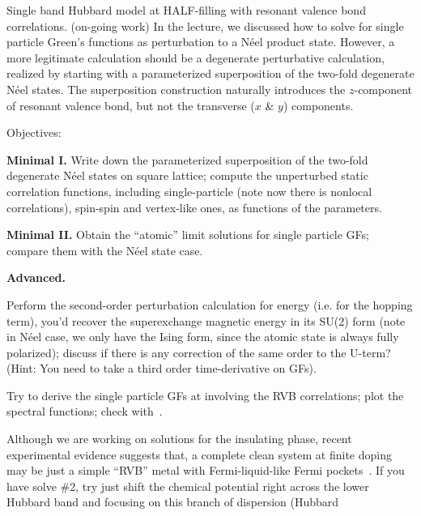 \begin{problem}
  Single band Hubbard model at HALF-filling with resonant valence bond
  correlations. (on-going work)
  In the lecture, we discussed how to solve for single particle Green's
  functions as perturbation to a N\'eel product state. However, a more
  legitimate calculation should be a degenerate perturbative calculation,
  realized by starting with a parameterized superposition of the two-fold
  degenerate N\'eel states. The superposition construction naturally introduces
  the $z$-component of resonant valence bond, but not the
  transverse ($x$ \& $y$) components.

  Objectives:
  \begin{enumext}
    \item \textbf{Minimal I.}
    Write down the parameterized superposition of the two-fold degenerate N\'eel
    states on square lattice; compute the unperturbed static correlation
    functions, including single-particle (note now there is nonlocal
    correlations), spin-spin and vertex-like ones, as functions of the
    parameters.
    \item \textbf{Minimal II.} Obtain the ``atomic'' limit solutions for single
    particle GFs; compare them with the N\'eel state case.
    \item \textbf{Advanced.}
    \begin{enumext}
      \item Perform the second-order perturbation calculation for energy (i.e.
      for the hopping term), you'd recover the superexchange magnetic energy in
      its SU(2) form (note in N\'eel case, we only have the Ising form, since
      the atomic state is always fully polarized); discuss if there is any
      correction of the same order to the U-term? (Hint: You need to take a
      third order time-derivative on GFs).
      \item Try to derive the single particle GFs at involving the RVB
      correlations; plot the spectral functions; check
      with~\emph{}.
      \item Although we are working on solutions for the insulating phase,
      recent experimental evidence suggests that, a complete clean system at
      finite doping may be just a simple ``RVB'' metal with Fermi-liquid-like
      Fermi pockets~\emph{}.
      If you have solve \#2, try just shift the chemical potential right across
      the lower Hubbard band and focusing on this branch of dispersion (Hubbard

\end{enumext}
\end{enumext}
\end{problem}
